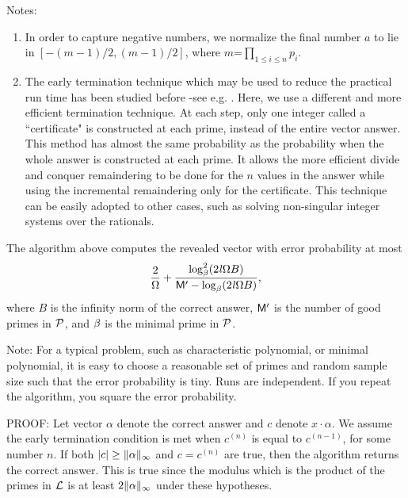 Notes:
\begin{enumerate}
\item
In order to capture negative numbers, 
we normalize the final number $a$ to lie in $[-(m-1)/2, (m-1)/2]$, 
where $m$=$\prod_{1\leq i \leq n} p_i$.
\item
The early termination technique which may be used to reduce the practical run time
has been studied before -see e.g. \cite{Emiris98,Kaltofen02, Eberly03}.
Here, we use a different and more efficient termination technique.
At each step, only one integer called a ``certificate" is constructed 
at each prime, instead of the entire vector answer. This method has almost
the same probability as the probability when the whole answer is constructed at each prime.  It allows the more efficient divide and conquer remaindering
to be done for the $n$ values in the answer while using the incremental
remaindering only for the certificate.
This technique can be easily adopted to other cases,
such as solving non-singular integer systems over the rationals.
\end{enumerate}
\begin{theorem}
The algorithm above computes the revealed vector with error probability at most 
\[\frac{2}{\Omega} +
\frac{\log^2_{\beta}(2\mathit l \Omega B)}
{\mathsf M^\prime - \log_{\beta}(2\mathit l \Omega B)},\]
where $B$ is the infinity norm of the correct answer,
$\mathsf M^\prime$ is the number of good primes in $\mathcal P$,
and $\beta$ is the minimal prime in $\mathcal P$.
\end{theorem}

Note: For a typical problem, such as characteristic polynomial, 
or minimal polynomial, it is easy to choose a reasonable set of primes 
and random sample size
such that the error probability is tiny.  Runs are independent. If you
repeat the algorithm, you square the error probability.

PROOF:
Let vector $\alpha$ denote the correct answer and
$c$ denote $x \cdot \alpha$. 
We assume the early termination condition is met when 
$c^{(n)}$ is equal to $c^{(n-1)}$, for some number $n$. 
If both $|c| \geq \|\alpha\|_\infty$ and
$c = c^{(n)}$ are true, then the algorithm returns the correct answer.
This is true since the modulus which is the product of the primes in $\mathcal L$ is at least 
$2 \|\alpha\|_\infty$ under these hypotheses.

